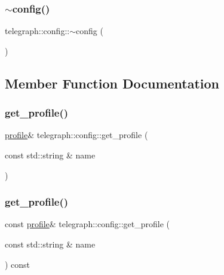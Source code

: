 \mbox{\label{classtelegraph_1_1config_a58461425cd48e9ce43eeaf5cffdf68ba}} 
\subsubsection{\texorpdfstring{$\sim$config()}{~config()}}
{\footnotesize\ttfamily telegraph\+::config\+::$\sim$config (\begin{DoxyParamCaption}{ }\end{DoxyParamCaption})}



\subsection{Member Function Documentation}
\mbox{\label{classtelegraph_1_1config_a9002a994691d15a3252c3fd23eaca014}} 
\subsubsection{\texorpdfstring{get\+\_\+profile()}{get\_profile()}\hspace{0.1cm}{\footnotesize\ttfamily [1/2]}}
{\footnotesize\ttfamily \hyperlink{classtelegraph_1_1profile}{profile}\& telegraph\+::config\+::get\+\_\+profile (\begin{DoxyParamCaption}\item[{const std\+::string \&}]{name }\end{DoxyParamCaption})\hspace{0.3cm}{\ttfamily [inline]}}

\mbox{\label{classtelegraph_1_1config_a7a8ab41521fa4af8d17d009c3872fb87}} 
\subsubsection{\texorpdfstring{get\+\_\+profile()}{get\_profile()}\hspace{0.1cm}{\footnotesize\ttfamily [2/2]}}
{\footnotesize\ttfamily const \hyperlink{classtelegraph_1_1profile}{profile}\& telegraph\+::config\+::get\+\_\+profile (\begin{DoxyParamCaption}\item[{const std\+::string \&}]{name }\end{DoxyParamCaption}) const\hspace{0.3cm}{\ttfamily [inline]}}

